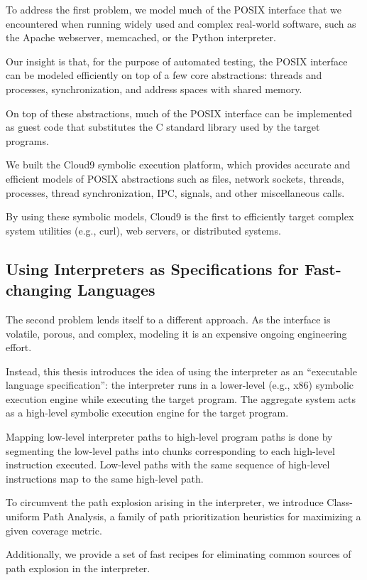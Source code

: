 To address the first problem, we model much of the POSIX interface that we encountered when running widely used and complex real-world software, such as the Apache webserver, memcached, or the Python interpreter.

Our insight is that, for the purpose of automated testing, the POSIX interface can be modeled efficiently on top of a few core abstractions: threads and processes, synchronization, and address spaces with shared memory.

On top of these abstractions, much of the POSIX interface can be implemented as guest code that substitutes the C standard library used by the target programs.

We built the Cloud9 symbolic execution platform, which provides accurate and efficient models of POSIX abstractions such as files, network sockets, threads, processes, thread synchronization, IPC, signals, and other miscellaneous calls.

By using these symbolic models, Cloud9 is the first to efficiently target complex system utilities (e.g., curl), web servers, or distributed systems.

\subsection{Using Interpreters as Specifications for Fast-changing Languages}

The second problem lends itself to a different approach.  As the interface is volatile, porous, and complex, modeling it is an expensive ongoing engineering effort.

Instead, this thesis introduces the idea of using the interpreter as an ``executable language specification'': the interpreter runs in a lower-level (e.g., x86) symbolic execution engine while executing the target program.  The aggregate system acts as a high-level symbolic execution engine for the target program.

Mapping low-level interpreter paths to high-level program paths is done by segmenting the low-level paths into chunks corresponding to each high-level instruction executed.  Low-level paths with the same sequence of high-level instructions map to the same high-level path.

To circumvent the path explosion arising in the interpreter, we introduce Class-uniform Path Analysis, a family of path prioritization heuristics for maximizing a given coverage metric.

Additionally, we provide a set of fast recipes for eliminating common sources of path explosion in the interpreter.

